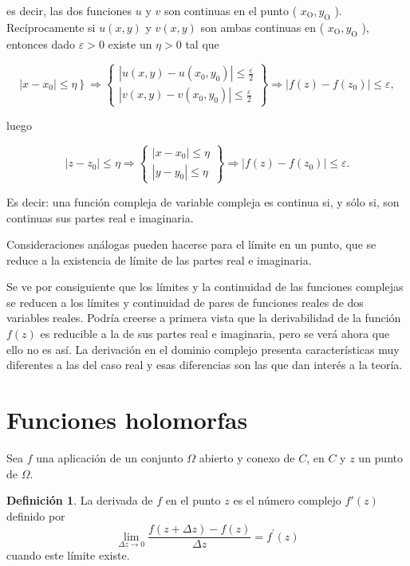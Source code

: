 \documentclass[10pt]{article}
\theoremstyle{plain}
\theoremstyle{definition}
\newtheorem{definition}[theorem]{Definición}
\theoremstyle{remark}
\begin{document}
es decir, las dos funciones $u$ y $v$ son continuas en el punto ( $x_{\mathrm{O}}, y_{\mathrm{O}}$ ).\\
Recíprocamente si $u(x, y)$ y $v(x, y)$ son ambas continuas en ( $x_{\mathrm{O}}, y_{\mathrm{O}}$ ), entonces dado $\varepsilon>0$ existe un $\eta>0$ tal que

$$
\left.\left|x-x_{0}\right| \leqslant \eta\right\} \Rightarrow\left\{\begin{array}{l}
\left|u(x, y)-u\left(x_{0}, y_{0}\right)\right| \leqslant \frac{\varepsilon}{2} \\
\left|v(x, y)-v\left(x_{0}, y_{0}\right)\right| \leqslant \frac{\varepsilon}{2}
\end{array}\right\} \Rightarrow\left|f(z)-f\left(z_{0}\right)\right| \leqslant \varepsilon,
$$

luego

$$
\left|z-z_{0}\right| \leqslant \eta \Rightarrow\left\{\begin{array}{c}
\left|x-x_{0}\right| \leqslant \eta \\
\left|y-y_{0}\right| \leqslant \eta
\end{array}\right\} \Rightarrow\left|f(z)-f\left(z_{0}\right)\right| \leqslant \varepsilon .
$$

Es decir: una función compleja de variable compleja es continua si, y sólo si, son continuas sus partes real e imaginaria.

Consideraciones análogas pueden hacerse para el límite en un punto, que se reduce a la existencia de límite de las partes real e imaginaria.

Se ve por consiguiente que los límites y la continuidad de las funciones complejas se reducen a los límites y continuidad de pares de funciones reales de dos variables reales. Podría creerse a primera vista que la derivabilidad de la función $f(z)$ es reducible a la de sus partes real e imaginaria, pero se verá ahora que ello no es así. La derivación en el dominio complejo presenta características muy diferentes a las del caso real y esas diferencias son las que dan interés a la teoría.


\section{Funciones holomorfas}
Sea $f$ una aplicación de un conjunto $\Omega$ abierto y conexo de $C$, en $C$ y $z$ un punto de $\Omega$.

\begin{definition}
La derivada de $f$ en el punto $z$ es el número complejo $f'(z)$ definido por
\begin{equation*}
\lim _{\Delta z \rightarrow 0} \frac{f(z+\Delta z)-f(z)}{\Delta z}=f^{\prime}(z) \tag{3-1}
\end{equation*}
cuando este límite existe.
\end{definition}
\end{document}
